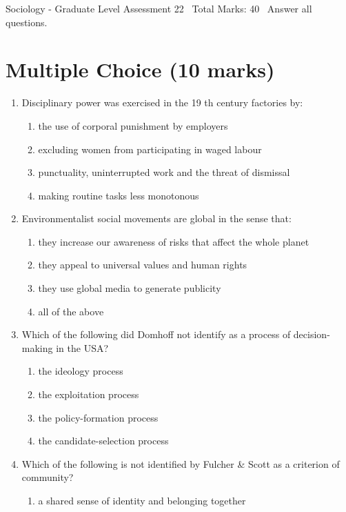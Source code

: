 \documentclass[12pt]{article}
\begin{document}
\begin{center}
Sociology - Graduate Level Assessment 22 \
Total Marks: 40 \
Answer all questions.
\end{center}

\section*{Multiple Choice (10 marks)}
\begin{enumerate}[label=\arabic*.]
\item Disciplinary power was exercised in the 19 th century factories by:
\begin{enumerate}[label=(\alph*)]
    \item the use of corporal punishment by employers
    \item excluding women from participating in waged labour
    \item punctuality, uninterrupted work and the threat of dismissal
    \item making routine tasks less monotonous
\end{enumerate}
\item Environmentalist social movements are global in the sense that:
\begin{enumerate}[label=(\alph*)]
    \item they increase our awareness of risks that affect the whole planet
    \item they appeal to universal values and human rights
    \item they use global media to generate publicity
    \item all of the above
\end{enumerate}
\item Which of the following did Domhoff not identify as a process of decision-making in the USA?
\begin{enumerate}[label=(\alph*)]
    \item the ideology process
    \item the exploitation process
    \item the policy-formation process
    \item the candidate-selection process
\end{enumerate}
\item Which of the following is not identified by Fulcher \& Scott as a criterion of community?
\begin{enumerate}[label=(\alph*)]
    \item a shared sense of identity and belonging together

\end{enumerate}
\end{enumerate}
\end{document}
